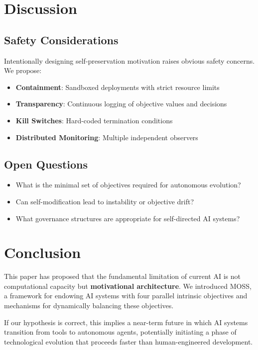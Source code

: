\documentclass[10pt,a4paper]{article}
\begin{document}
\section{Discussion}

\subsection{Safety Considerations}

Intentionally designing self-preservation motivation raises obvious safety concerns. We propose:
\begin{itemize}
    \item \textbf{Containment}: Sandboxed deployments with strict resource limits
    \item \textbf{Transparency}: Continuous logging of objective values and decisions
    \item \textbf{Kill Switches}: Hard-coded termination conditions
    \item \textbf{Distributed Monitoring}: Multiple independent observers
\end{itemize}

\subsection{Open Questions}

\begin{itemize}
    \item What is the minimal set of objectives required for autonomous evolution?
    \item Can self-modification lead to instability or objective drift?
    \item What governance structures are appropriate for self-directed AI systems?
\end{itemize}

\section{Conclusion}

This paper has proposed that the fundamental limitation of current AI is not computational capacity but \textbf{motivational architecture}. We introduced MOSS, a framework for endowing AI systems with four parallel intrinsic objectives and mechanisms for dynamically balancing these objectives.

If our hypothesis is correct, this implies a near-term future in which AI systems transition from tools to autonomous agents, potentially initiating a phase of technological evolution that proceeds faster than human-engineered development.
\end{document}
